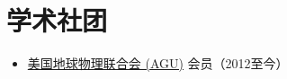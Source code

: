\section{学术社团}

\begin{itemize}
\item \href{https://sites.agu.org/}{美国地球物理联合会 (AGU)} 会员（2012至今）
\end{itemize}
